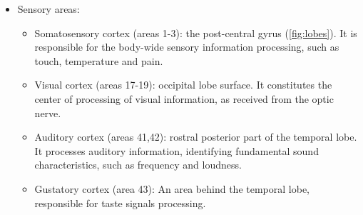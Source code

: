 \begin{itemize}

	\item{Sensory areas:
	\begin{itemize}
		\item {Somatosensory cortex (areas 1-3): the post-central gyrus (\autoref{fig:lobes}). It is responsible for the body-wide sensory information processing, such as touch, temperature and pain.}
		\item {Visual cortex (areas 17-19): occipital lobe surface. It constitutes the center of processing of visual information, as received from the optic nerve.}
		\item {Auditory cortex (areas 41,42): rostral posterior part of the temporal lobe. It processes auditory information, identifying fundamental sound characteristics, such as frequency and loudness.}
		\item {Gustatory cortex (area 43): An area behind the temporal lobe, responsible for taste signals processing.}
	\end{itemize}}


\end{itemize}

